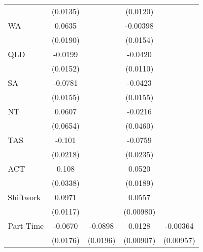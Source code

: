 {\begin{tabular}{l*{4}{c}}
                    &    (0.0135)         &                     &    (0.0120)         &                     \\
[1em]
WA                  &      0.0635\sym{***}&                     &    -0.00398         &                     \\
                    &    (0.0190)         &                     &    (0.0154)         &                     \\
[1em]
QLD                 &     -0.0199         &                     &     -0.0420\sym{***}&                     \\
                    &    (0.0152)         &                     &    (0.0110)         &                     \\
[1em]
SA                  &     -0.0781\sym{***}&                     &     -0.0423\sym{**} &                     \\
                    &    (0.0155)         &                     &    (0.0155)         &                     \\
[1em]
NT                  &      0.0607         &                     &     -0.0216         &                     \\
                    &    (0.0654)         &                     &    (0.0460)         &                     \\
[1em]
TAS                 &      -0.101\sym{***}&                     &     -0.0759\sym{**} &                     \\
                    &    (0.0218)         &                     &    (0.0235)         &                     \\
[1em]
ACT                 &       0.108\sym{**} &                     &      0.0520\sym{**} &                     \\
                    &    (0.0338)         &                     &    (0.0189)         &                     \\
[1em]
Shiftwork           &      0.0971\sym{***}&                     &      0.0557\sym{***}&                     \\
                    &    (0.0117)         &                     &   (0.00980)         &                     \\
[1em]
Part Time           &     -0.0670\sym{***}&     -0.0898\sym{***}&      0.0128         &    -0.00364         \\
                    &    (0.0176)         &    (0.0196)         &   (0.00907)         &   (0.00957)         \\

\end{tabular}}
